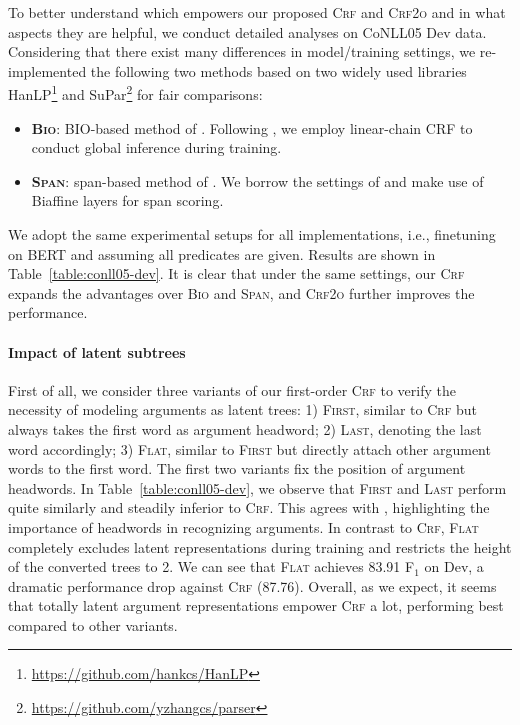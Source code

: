 \documentclass[11pt]{article}
\begin{document}
To better understand which empowers our proposed \textsc{Crf} and \textsc{Crf2o} and in what aspects they are helpful, we conduct detailed analyses on CoNLL05 Dev data.
Considering that there exist many differences in model/training settings, we re-implemented the following two methods based on two widely used libraries HanLP\footnote{\url{https://github.com/hankcs/HanLP}} \cite{he-choi-2021-stem} and SuPar\footnote{\url{https://github.com/yzhangcs/parser}} for fair comparisons:
\begin{itemize}[leftmargin=11pt]
    \item \textbf{\textsc{Bio}}: BIO-based method of \citet{zhou-xu-2015-end}.
          Following \citet{zhang-etal-2021-comparing}, we employ linear-chain CRF \cite{lafferty-etal-2001-crf} to conduct global inference during training.
    \item \textbf{\textsc{Span}}: span-based method of \citet{he-etal-2018-jointly}.
          We borrow the settings of \citet{strubell-etal-2018-lisa} and make use of Biaffine layers for span scoring.
\end{itemize}
We adopt the same experimental setups for all implementations, i.e., finetuning on BERT and assuming all predicates are given.
Results are shown in Table~\ref{table:conll05-dev}.
It is clear that under the same settings, our \textsc{Crf} expands the advantages over \textsc{Bio} and \textsc{Span}, and \textsc{Crf2o} further improves the performance.

\paragraph{Impact of latent subtrees}
First of all, we consider three variants of our first-order \textsc{Crf} to verify the necessity of modeling arguments as latent trees:
1) \textsc{First}, similar to \textsc{Crf} but always takes the first word as argument headword;
2) \textsc{Last}, denoting the last word accordingly;
3) \textsc{Flat}, similar to \textsc{First} but directly attach other argument words to the first word.
The first two variants fix the position of argument headwords.
In Table~\ref{table:conll05-dev}, we observe that \textsc{First} and \textsc{Last} perform quite similarly and steadily inferior to \textsc{Crf}.
This agrees with \citet{zhang-etal-2021-comparing}, highlighting the importance of headwords in recognizing arguments.
In contrast to \textsc{Crf}, \textsc{Flat} completely excludes latent representations during training and restricts the height of the converted trees to 2.
We can see that \textsc{Flat} achieves 83.91 F$_1$ on Dev, a dramatic performance drop against \textsc{Crf} (87.76).
Overall, as we expect, it seems that totally latent argument representations empower \textsc{Crf} a lot, performing best compared to other variants.
\end{document}
